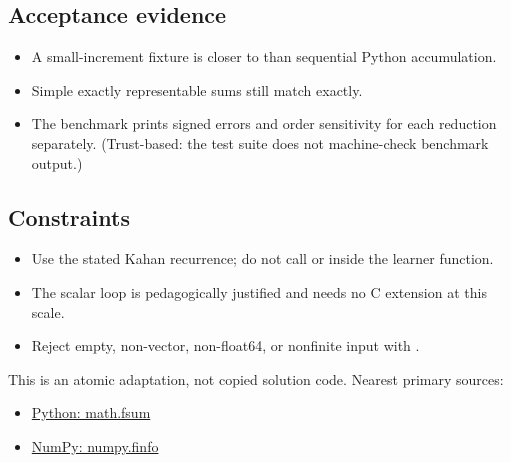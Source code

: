         \subsection{Acceptance evidence}

        \begin{evidencebox}
        \begin{itemize}
          \item A small-increment fixture is closer to  than sequential Python accumulation.
  \item Simple exactly representable sums still match exactly.
  \item The benchmark prints signed errors and order sensitivity for each reduction separately. (Trust-based: the test suite does not machine-check benchmark output.)
        \end{itemize}
        \end{evidencebox}

        \subsection{Constraints}

        \begin{itemize}
          \item Use the stated Kahan recurrence; do not call  or  inside the learner function.
  \item The scalar loop is pedagogically justified and needs no C extension at this scale.
  \item Reject empty, non-vector, non-float64, or nonfinite input with .
        \end{itemize}

        \begin{sourcebox}
        This is an atomic adaptation, not copied solution code. Nearest primary sources:
        \begin{itemize}
          \item \href{https://docs.python.org/3/library/math.html#math.fsum}{Python: math.fsum}
  \item \href{https://numpy.org/doc/stable/reference/generated/numpy.finfo.html}{NumPy: numpy.finfo}
        \end{itemize}
        \end{sourcebox}
